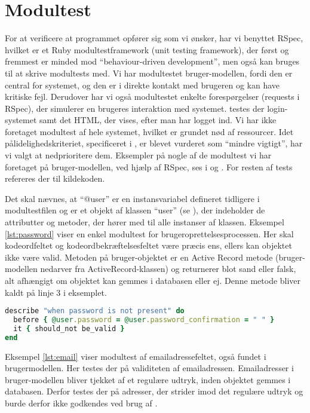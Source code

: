 \section{Modultest}
\label{sec:unittests}
For at verificere at programmet opfører sig som vi ønsker, har vi benyttet RSpec, hvilket er et Ruby modultestframework (unit testing framework), der først og fremmest er minded mod ``behaviour-driven development'', men også kan bruges til at skrive modultests med. Vi har modultestet bruger-modellen, fordi den er central for systemet, og den er i direkte kontakt med brugeren og kan have kritiske fejl. Derudover har vi også modultestet enkelte forespørgelser (requests i RSpec), der simulerer en brugeres interaktion med systemet. \Fx testes der login-systemet samt det HTML, der vises, efter man har logget ind. Vi har ikke foretaget modultest af hele systemet, hvilket er grundet nød af ressourcer. Idet pålidelighedskriteriet, specificeret i , er blevet vurderet som ``mindre vigtigt'', har vi valgt at nedprioritere dem. Eksempler på nogle af de modultest vi har foretaget på bruger-modellen, ved hjælp af RSpec, ses i  og . For resten af tests refereres der til kildekoden.


Det skal nævnes, at ``@user'' er en instansvariabel defineret tidligere i modultestfilen og er et objekt af klassen ``user'' (se ), der indeholder de attributter og metoder, der hører med til alle instanser af klassen. Eksempel \ref{lst:password} viser en enkel modultest for brugeroprettelsesprocessen. Her skal kodeordfeltet og kodeordbekræftelsesfeltet være præcis ens, ellers kan objektet ikke være valid. Metoden  på bruger-objektet er en Active Record metode (bruger-modellen nedarver fra ActiveRecord-klassen) og returnerer blot sand eller falsk, alt afhængigt om objektet kan gemmes i databasen eller ej. Denne metode bliver kaldt på linje 3 i eksemplet.

\begin{lstlisting}[caption={Modultest af brugerens har indtastede password, når han/hun opretter sig som bruger},label=lst:password,language=Ruby]
describe "when password is not present" do
  before { @user.password = @user.password_confirmation = " " }
  it { should_not be_valid }
end
\end{lstlisting}

Eksempel \ref{lst:email} viser modultest af emailadressefeltet, også fundet i brugermodellen. Her testes der på validiteten af emailadressen. Emailadresser i bruger-modellen bliver tjekket af et regulære udtryk, inden objektet gemmes i databasen. Derfor testes der på adresser, der strider imod det regulære udtryk og burde derfor ikke godkendes ved brug af .


